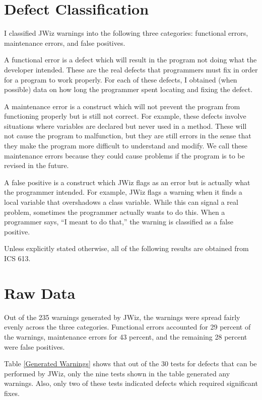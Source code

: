 \section{Defect Classification}
I classified JWiz warnings into the following three categories: functional
errors, maintenance errors, and false positives.

A functional error is a defect which will result in the program not doing
what the developer intended. These are the real defects that programmers
must fix in order for a program to work properly.  For each of these
defects, I obtained (when possible) data on how long the programmer spent
locating and fixing the defect.

A maintenance error is a construct which will not prevent the program from
functioning properly but is still not correct.  For example, these defects
involve situations where variables are declared but never used in a method.
These will not cause the program to malfunction, but they are still errors
in the sense that they make the program more difficult to understand and
modify.  We call these maintenance errors because they could cause problems
if the program is to be revised in the future.

A false positive is a construct which JWiz flags as an error but is
actually what the programmer intended.  For example, JWiz flags a warning
when it finds a local variable that overshadows a class variable.  While
this can signal a real problem, sometimes the programmer actually wants to
do this.  When a programmer says, ``I meant to do that,'' the warning is
classified as a false positive.

Unless explicitly stated otherwise, all of the following results are
obtained from ICS 613.

\section{Raw Data}
Out of the 235 warnings generated by JWiz, the warnings were spread fairly
evenly across the three categories.  Functional errors accounted for 29
percent of the warnings, maintenance errors for 43 percent, and the
remaining 28 percent were false positives.

Table \ref{Generated Warnings} shows that out of the 30 tests for defects
that can be performed by JWiz, only the nine tests shown in the table
generated any warnings.  Also, only two of these tests indicated defects
which required significant fixes.

